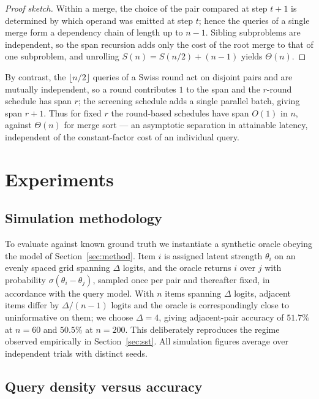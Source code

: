 \documentclass[11pt,a4paper]{article}
\begin{document}
\begin{proof}[Proof sketch]
Within a merge, the choice of the pair compared at step $t+1$ is determined by
which operand was emitted at step $t$; hence the queries of a single merge form a
dependency chain of length up to $n-1$. Sibling subproblems are independent, so
the span recursion adds only the cost of the root merge to that of one
subproblem, and unrolling $S(n) = S(n/2) + (n-1)$ yields $\Theta(n)$.
\end{proof}

By contrast, the $\lfloor n/2 \rfloor$ queries of a Swiss round act on disjoint
pairs and are mutually independent, so a round contributes $1$ to the span and
the $r$-round schedule has span $r$; the screening schedule adds a single
parallel batch, giving span $r+1$. Thus for fixed $r$ the round-based schedules
have span $O(1)$ in $n$, against $\Theta(n)$ for merge sort --- an asymptotic
separation in attainable latency, independent of the constant-factor cost of an
individual query.

\section{Experiments}
\label{sec:experiments}

\subsection{Simulation methodology}

To evaluate against known ground truth we instantiate a synthetic oracle obeying
the model of Section~\ref{sec:method}. Item $i$ is assigned latent strength
$\theta_i$ on an evenly spaced grid spanning $\Delta$ logits, and the oracle
returns $i$ over $j$ with probability $\sigma(\theta_i - \theta_j)$, sampled once
per pair and thereafter fixed, in accordance with the query model. With
$n$ items spanning $\Delta$ logits, adjacent items differ by
$\Delta/(n-1)$ logits and the oracle is correspondingly close to
uninformative on them; we choose $\Delta = 4$, giving adjacent-pair accuracy of
$51.7\%$ at $n = 60$ and $50.5\%$ at $n = 200$. This deliberately reproduces the
regime observed empirically in Section~\ref{sec:sst}. All simulation figures
average over independent trials with distinct seeds.

\subsection{Query density versus accuracy}
\label{sec:density}
\end{document}
